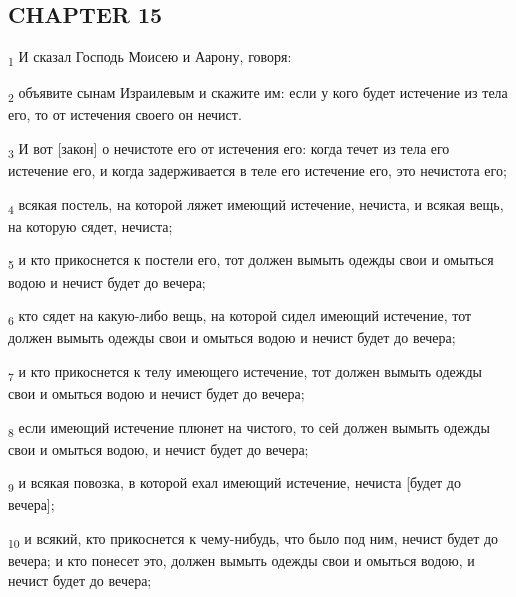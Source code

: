 \subsection{CHAPTER 15}
\begin{tcolorbox}
\textsubscript{1} И сказал Господь Моисею и Аарону, говоря:
\end{tcolorbox}
\begin{tcolorbox}
\textsubscript{2} объявите сынам Израилевым и скажите им: если у кого будет истечение из тела его, то от истечения своего он нечист.
\end{tcolorbox}
\begin{tcolorbox}
\textsubscript{3} И вот [закон] о нечистоте его от истечения его: когда течет из тела его истечение его, и когда задерживается в теле его истечение его, это нечистота его;
\end{tcolorbox}
\begin{tcolorbox}
\textsubscript{4} всякая постель, на которой ляжет имеющий истечение, нечиста, и всякая вещь, на которую сядет, нечиста;
\end{tcolorbox}
\begin{tcolorbox}
\textsubscript{5} и кто прикоснется к постели его, тот должен вымыть одежды свои и омыться водою и нечист будет до вечера;
\end{tcolorbox}
\begin{tcolorbox}
\textsubscript{6} кто сядет на какую-либо вещь, на которой сидел имеющий истечение, тот должен вымыть одежды свои и омыться водою и нечист будет до вечера;
\end{tcolorbox}
\begin{tcolorbox}
\textsubscript{7} и кто прикоснется к телу имеющего истечение, тот должен вымыть одежды свои и омыться водою и нечист будет до вечера;
\end{tcolorbox}
\begin{tcolorbox}
\textsubscript{8} если имеющий истечение плюнет на чистого, то сей должен вымыть одежды свои и омыться водою, и нечист будет до вечера;
\end{tcolorbox}
\begin{tcolorbox}
\textsubscript{9} и всякая повозка, в которой ехал имеющий истечение, нечиста [будет до вечера];
\end{tcolorbox}
\begin{tcolorbox}
\textsubscript{10} и всякий, кто прикоснется к чему-нибудь, что было под ним, нечист будет до вечера; и кто понесет это, должен вымыть одежды свои и омыться водою, и нечист будет до вечера;
\end{tcolorbox}
